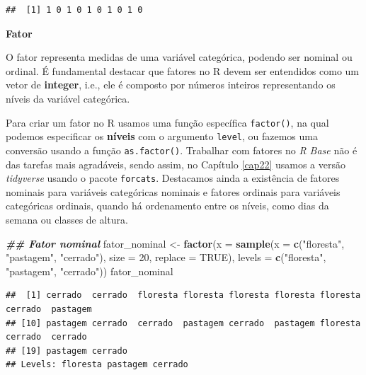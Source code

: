 \documentclass[
]{article}
\newenvironment{Shaded}{\begin{snugshade}}{\end{snugshade}}
\newcommand{\AttributeTok}[1]{\textcolor[rgb]{0.13,0.29,0.53}{#1}}
\newcommand{\ConstantTok}[1]{\textcolor[rgb]{0.56,0.35,0.01}{#1}}
\newcommand{\DecValTok}[1]{\textcolor[rgb]{0.00,0.00,0.81}{#1}}
\newcommand{\DocumentationTok}[1]{\textcolor[rgb]{0.56,0.35,0.01}{\textbf{\textit{#1}}}}
\newcommand{\FunctionTok}[1]{\textcolor[rgb]{0.13,0.29,0.53}{\textbf{#1}}}
\newcommand{\NormalTok}[1]{#1}
\newcommand{\OtherTok}[1]{\textcolor[rgb]{0.56,0.35,0.01}{#1}}
\newcommand{\StringTok}[1]{\textcolor[rgb]{0.31,0.60,0.02}{#1}}
\begin{document}
\begin{verbatim}
##  [1] 1 0 1 0 1 0 1 0 1 0
\end{verbatim}

\textbf{Fator}

O fator representa medidas de uma variável categórica, podendo ser nominal ou ordinal. É fundamental destacar que fatores no R devem ser entendidos como um vetor de \textbf{integer}, i.e., ele é composto por números inteiros representando os níveis da variável categórica.

Para criar um fator no R usamos uma função específica \texttt{factor()}, na qual podemos especificar os \textbf{níveis} com o argumento \texttt{level}, ou fazemos uma conversão usando a função \texttt{as.factor()}. Trabalhar com fatores no \emph{R Base} não é das tarefas mais agradáveis, sendo assim, no Capítulo \ref{cap22} usamos a versão \emph{tidyverse} usando o pacote \texttt{forcats}. Destacamos ainda a existência de fatores nominais para variáveis categóricas nominais e fatores ordinais para variáveis categóricas ordinais, quando há ordenamento entre os níveis, como dias da semana ou classes de altura.

\begin{Shaded}
\begin{Highlighting}[]
\DocumentationTok{\#\# Fator nominal}
\NormalTok{fator\_nominal }\OtherTok{\textless{}{-}} \FunctionTok{factor}\NormalTok{(}\AttributeTok{x =} \FunctionTok{sample}\NormalTok{(}\AttributeTok{x =} \FunctionTok{c}\NormalTok{(}\StringTok{"floresta"}\NormalTok{, }\StringTok{"pastagem"}\NormalTok{, }\StringTok{"cerrado"}\NormalTok{), }
                                   \AttributeTok{size =} \DecValTok{20}\NormalTok{, }\AttributeTok{replace =} \ConstantTok{TRUE}\NormalTok{),}
                        \AttributeTok{levels =} \FunctionTok{c}\NormalTok{(}\StringTok{"floresta"}\NormalTok{, }\StringTok{"pastagem"}\NormalTok{, }\StringTok{"cerrado"}\NormalTok{))}
\NormalTok{fator\_nominal}
\end{Highlighting}
\end{Shaded}

\begin{verbatim}
##  [1] cerrado  cerrado  floresta floresta floresta floresta floresta cerrado  pastagem
## [10] pastagem cerrado  cerrado  pastagem cerrado  pastagem floresta cerrado  cerrado 
## [19] pastagem cerrado 
## Levels: floresta pastagem cerrado
\end{verbatim}
\end{document}
